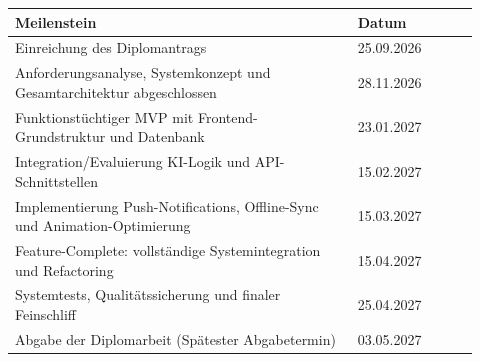 \begin{tabular}{@{}p{0.68\linewidth}p{0.24\linewidth}}
	\toprule
	\bfseries Meilenstein & \bfseries Datum \\
	\midrule
	Einreichung des Diplomantrags & 25.09.2026 \\
	Anforderungsanalyse, Systemkonzept und Gesamtarchitektur abgeschlossen & 28.11.2026 \\
	Funktionstüchtiger MVP mit Frontend-Grundstruktur und Datenbank & 23.01.2027 \\
	Integration/Evaluierung KI-Logik und API-Schnittstellen & 15.02.2027 \\
	Implementierung Push-Notifications, Offline-Sync und Animation-Optimierung & 15.03.2027 \\
	Feature-Complete: vollständige Systemintegration und Refactoring & 15.04.2027 \\
	Systemtests, Qualitätssicherung und finaler Feinschliff & 25.04.2027 \\
	Abgabe der Diplomarbeit (Spätester Abgabetermin) & 03.05.2027 \\
	\bottomrule
\end{tabular}
